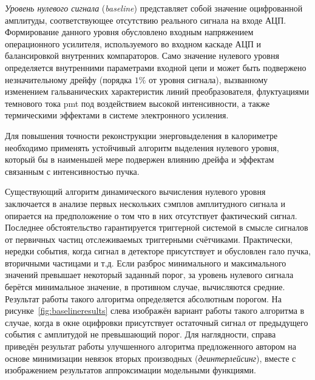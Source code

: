 \emph{Уровень нулевого сигнала} (\emph{baseline}) представляет собой значение оцифрованной амплитуды, соответствующее отсутствию реального сигнала
на входе АЦП.
Формирование данного уровня обусловлено входным напряжением операционного
усилителя, используемого во входном каскаде АЦП и балансировкой
внутренних компараторов. Само значение нулевого уровня определяется
внутренними параметрами входной цепи и может быть подвержено незначительному
дрейфу (порядка $1 \%$ от уровня сигнала), вызванному изменением
гальванических характеристик линий преобразователя, флуктуациями темнового
тока \acrshort{pmt} под воздействием высокой интенсивности, а также
термическими эффектами в системе электронного усиления.

Для повышения точности реконструкции энерговыделения в калориметре
необходимо применять устойчивый алгоритм выделения нулевого уровня, который бы
в наименьшей мере подвержен влиянию дрейфа и эффектам связанным с
интенсивностью пучка.

Существующий алгоритм динамического вычисления нулевого уровня заключается
в анализе первых нескольких сэмплов амплитудного сигнала и опирается на
предположение о том что в них отсутствует фактический сигнал. Последнее
обстоятельство гарантируется триггерной системой в смысле сигналов от
первичных частиц отслеживаемых триггерными счётчиками. Практически, нередки
события, когда сигнал в детекторе присутствует и обусловлен гало пучка, 
вторичными частицами и т.д. Если разброс
минимального и максимального значений превышает некоторый заданный порог,
за уровень нулевого сигнала берётся минимальное значение, в противном случае,
вычисляются средние. Результат работы такого алгоритма определяется
абсолютным порогом. На рисунке~\ref{fig:baselineresults} слева изображён
вариант работы такого алгоритма в случае, когда в окне оцифровки присутствует
остаточный сигнал от предыдущего события с амплитудой не превышающий
порог. Для наглядности, справа приведён результат работы улучшенного
алгоритма предложенного автором на основе минимизации невязок вторых
производных (\emph{деинтерлейсинг}), вместе с изображением результатов
аппроксимации модельными функциями.

